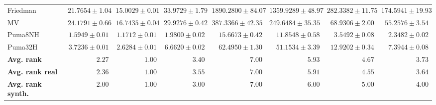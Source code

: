 \begin{table*}[!htbp]
{\begin{tabular}{lrrrrrrr}
		Friedman & $21.7654 \pm 1.04$ & $\mathbf{15.0029 \pm 0.01}$ & $33.9729 \pm 1.79$ & $1890.2800 \pm 84.07$ & $1359.9289 \pm 48.97$ & $282.3382 \pm 11.75$ & $174.5941 \pm 19.93$\\
		MV & $24.1791 \pm 0.66$ & $\mathbf{16.7435 \pm 0.04}$ & $29.9276 \pm 0.42$ & $387.3366 \pm 42.35$ & $249.6484 \pm 35.35$ & $68.9306 \pm 2.00$ & $55.2576 \pm 3.54$\\
		Puma8NH & $1.5949 \pm 0.01$ & $\mathbf{1.1712 \pm 0.01}$ & $1.9800 \pm 0.02$ & $15.6673 \pm 0.42$ & $11.8548 \pm 0.58$ & $3.5492 \pm 0.08$ & $2.3482 \pm 0.02$\\
		Puma32H & $3.7236 \pm 0.01$ & $\mathbf{2.6284 \pm 0.01}$ & $6.6620 \pm 0.02$ & $62.4950 \pm 1.30$ & $51.1534 \pm 3.39$ & $12.9202 \pm 0.34$ & $7.3944 \pm 0.08$\\
		\midrule
		\textbf{{Avg. rank}} & $2.27$ & $\mathbf{1.00}$ & $3.40$ & $7.00$ & $5.93$ & $4.67$ & $3.73$\\
		\textbf{{Avg. rank real}} & $2.36$ & $\mathbf{1.00}$ & $3.55$ & $7.00$ & $5.91$ & $4.55$ & $3.64$\\
		\textbf{{Avg. rank synth.}} & $2.00$ & $\mathbf{1.00}$ & $3.00$ & $7.00$ & $6.00$ & $5.00$ & $4.00$\\
		\bottomrule
	\end{tabular}}
\end{table*}
